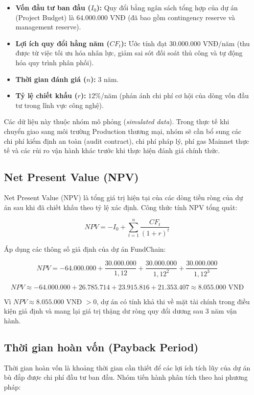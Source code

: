 \begin{itemize}
  \item \textbf{Vốn đầu tư ban đầu ($I_0$):} Quy đổi bằng ngân sách tổng hợp của dự án (Project Budget) là $64.000.000$ VNĐ (đã bao gồm contingency reserve và management reserve).
  \item \textbf{Lợi ích quy đổi hằng năm ($CF_t$):} Ước tính đạt $30.000.000$ VNĐ/năm (thu được từ việc tối ưu hóa nhân lực, giảm sai sót đối soát thủ công và tự động hóa quy trình phân phối).
  \item \textbf{Thời gian đánh giá ($n$):} $3$ năm.
  \item \textbf{Tỷ lệ chiết khấu ($r$):} $12\%$/năm (phản ánh chi phí cơ hội của dòng vốn đầu tư trong lĩnh vực công nghệ).
\end{itemize}

Các dữ liệu này thuộc nhóm mô phỏng (\textit{simulated data}). Trong thực tế khi chuyển giao sang môi trường Production thương mại, nhóm sẽ cần bổ sung các chi phí kiểm định an toàn (audit contract), chi phí pháp lý, phí gas Mainnet thực tế và các rủi ro vận hành khác trước khi thực hiện đánh giá chính thức.

\subsection{Net Present Value (NPV)}

Net Present Value (NPV) là tổng giá trị hiện tại của các dòng tiền ròng của dự án sau khi đã chiết khấu theo tỷ lệ xác định. Công thức tính NPV tổng quát:

\[
NPV = -I_0 + \sum_{t=1}^{n} \frac{CF_t}{(1 + r)^t}
\]

Áp dụng các thông số giả định của dự án FundChain:

\[
NPV = -64.000.000 + \frac{30.000.000}{1{,}12} + \frac{30.000.000}{1{,}12^2} + \frac{30.000.000}{1{,}12^3}
\]

\[
NPV \approx -64.000.000 + 26.785.714 + 23.915.816 + 21.353.407 \approx 8.055.000 \text{ VNĐ}
\]

Vì $NPV \approx 8.055.000$ VNĐ $> 0$, dự án có tính khả thi về mặt tài chính trong điều kiện giả định và mang lại giá trị thặng dư ròng quy đổi dương sau 3 năm vận hành.

\subsection{Thời gian hoàn vốn (Payback Period)}

Thời gian hoàn vốn là khoảng thời gian cần thiết để các lợi ích tích lũy của dự án bù đắp được chi phí đầu tư ban đầu. Nhóm tiến hành phân tích theo hai phương pháp:

